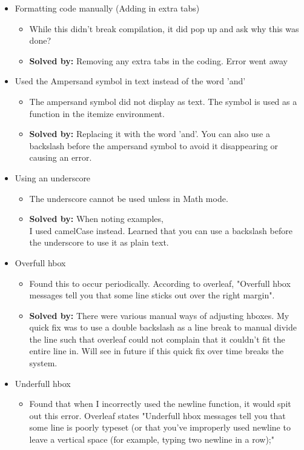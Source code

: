 \documentclass{article}
\begin{document}
\begin{itemize}
    \item Formatting code manually (Adding in extra tabs)
    \begin{itemize}
        \item While this didn't break compilation, it did pop up and ask why this was done?
        \item \textbf{Solved by:} Removing any extra tabs in the coding. Error went away
    \end{itemize}
    \item Used the Ampersand symbol in text instead of the word 'and'
    \begin{itemize}
        \item The ampersand symbol did not display as text. The symbol is used as a function in the itemize environment.
        \item \textbf{Solved by:} Replacing it with the word 'and'. You can also use a backslash before the ampersand symbol to avoid it disappearing or causing an error.
    \end{itemize}
    \item Using an underscore
    \begin{itemize}
        \item The underscore cannot be used unless in Math mode.
        \item \textbf{Solved by:} When noting examples, \\ I used camelCase instead. Learned that you can use a backslash before the underscore to use it as plain text.
    \end{itemize}
    \item Overfull hbox
    \begin{itemize}
        \item Found this to occur periodically. According to overleaf, "Overfull hbox messages tell you that some line sticks out over the right margin".
        \item \textbf{Solved by:} There were various manual ways of adjusting hboxes. My quick fix was to use a double backslash as a line break to manual divide the line such that overleaf could not complain that it couldn't fit the entire line in. Will see in future if this quick fix over time breaks the system.
    \end{itemize}
    \item Underfull hbox
    \begin{itemize}
        \item Found that when I incorrectly used the newline function, it would spit out this error. Overleaf states "Underfull hbox messages tell you that some line is poorly typeset (or that you've improperly used newline to leave a vertical space (for example, typing two newline in a row);"

\end{itemize}
\end{itemize}
\end{document}
